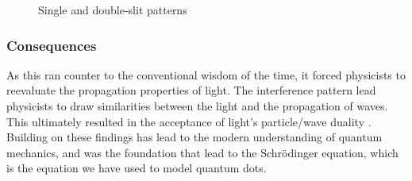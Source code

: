 \documentclass[authoryearcitations]{UoYCSproject}
\begin{document}
\begin{figure}
\centering
{}
\caption{Single and double-slit patterns}
\label{fig:patterns}
\end{figure}


 \subsubsection{Consequences}
As this ran counter to the conventional wisdom of the time, it forced physicists to reevaluate the propagation
properties of light. The interference pattern lead physicists to draw similarities between the light and the propagation of 
waves. This ultimately resulted in the acceptance of light's particle/wave duality \cite{ralph}. Building on these findings
has lead to the modern understanding of quantum mechanics, and was the foundation that lead to the Schr\"{o}dinger equation, 
which is the equation we have used to model quantum dots. 
\end{document}
